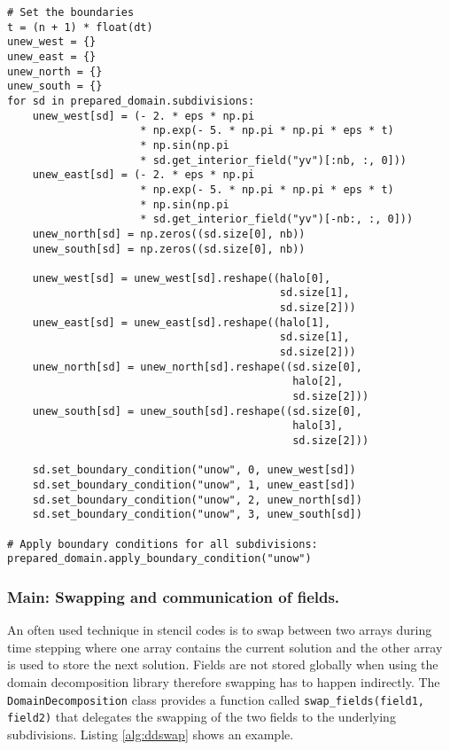 \begin{lstlisting}[caption={Example code of handling the global boundary condition.},captionpos=b, label={alg:ddbc}, float, floatplacement=H]
# Set the boundaries
t = (n + 1) * float(dt)
unew_west = {}
unew_east = {}
unew_north = {}
unew_south = {}
for sd in prepared_domain.subdivisions:
    unew_west[sd] = (- 2. * eps * np.pi 
                     * np.exp(- 5. * np.pi * np.pi * eps * t)
                     * np.sin(np.pi 
                     * sd.get_interior_field("yv")[:nb, :, 0]))
    unew_east[sd] = (- 2. * eps * np.pi 
                     * np.exp(- 5. * np.pi * np.pi * eps * t)
                     * np.sin(np.pi 
                     * sd.get_interior_field("yv")[-nb:, :, 0]))
    unew_north[sd] = np.zeros((sd.size[0], nb))
    unew_south[sd] = np.zeros((sd.size[0], nb))

    unew_west[sd] = unew_west[sd].reshape((halo[0], 
                                           sd.size[1],
                                           sd.size[2]))
    unew_east[sd] = unew_east[sd].reshape((halo[1],
                                           sd.size[1],
                                           sd.size[2]))
    unew_north[sd] = unew_north[sd].reshape((sd.size[0],
                                             halo[2],
                                             sd.size[2]))
    unew_south[sd] = unew_south[sd].reshape((sd.size[0],
                                             halo[3],
                                             sd.size[2]))

    sd.set_boundary_condition("unow", 0, unew_west[sd])
    sd.set_boundary_condition("unow", 1, unew_east[sd])
    sd.set_boundary_condition("unow", 2, unew_north[sd])
    sd.set_boundary_condition("unow", 3, unew_south[sd])

# Apply boundary conditions for all subdivisions:
prepared_domain.apply_boundary_condition("unow")
\end{lstlisting}

\subsubsection{Main: Swapping and communication of fields.}
An often used technique in stencil codes is to swap between two arrays during time stepping where one array contains the current solution and the other array is used to store the next solution.
Fields are not stored globally when using the domain decomposition library therefore swapping has to happen indirectly.
The \texttt{DomainDecomposition} class provides a function called \texttt{swap\_fields(field1, field2)} that delegates the swapping of the two fields to the underlying subdivisions.
Listing \ref{alg:ddswap} shows an example.

